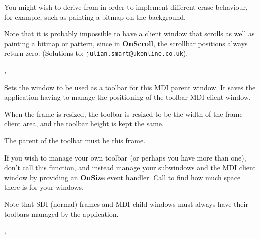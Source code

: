 
You might wish to derive from  in order
to implement different erase behaviour, for example, such as painting a bitmap
on the background.

Note that it is probably impossible to have a client window that scrolls as well as painting
a bitmap or pattern, since in {\bf OnScroll}, the scrollbar positions always return zero.
(Solutions to: \verb$julian.smart@ukonline.co.uk$).


,\rtfsp
{}

\label{wxmdiparentframesettoolbar}


Sets the window to be used as a toolbar for this
MDI parent window. It saves the application having to manage the positioning
of the toolbar MDI client window.




When the frame is resized, the toolbar is resized to be the width of
the frame client area, and the toolbar height is kept the same.

The parent of the toolbar must be this frame.

If you wish to manage your own toolbar (or perhaps you have more than one),
don't call this function, and instead manage your subwindows and the MDI client window by
providing an {\bf OnSize} event handler. Call  to
find how much space there is for your windows.

Note that SDI (normal) frames and MDI child windows must always have their
toolbars managed by the application.


,\rtfsp
{}

\label{wxmdiparentframesetwindowmenu}


